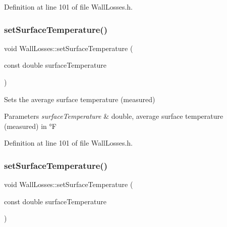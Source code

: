 Definition at line 101 of file Wall\+Losses.\+h.

\mbox{\label{class_wall_losses_a7aaa1bd0d7e0ec67db33668ccc6c48da}} 
\subsubsection{\texorpdfstring{set\+Surface\+Temperature()}{setSurfaceTemperature()}\hspace{0.1cm}{\footnotesize\ttfamily [2/3]}}
{\footnotesize\ttfamily void Wall\+Losses\+::set\+Surface\+Temperature (\begin{DoxyParamCaption}\item[{const double}]{surface\+Temperature }\end{DoxyParamCaption})\hspace{0.3cm}{\ttfamily [inline]}}

Sets the average surface temperature (measured) 
\begin{DoxyParams}{Parameters}
{\em surface\+Temperature} & double, average surface temperature (measured) in °F \\
\hline
\end{DoxyParams}


Definition at line 101 of file Wall\+Losses.\+h.

\mbox{\label{class_wall_losses_a7aaa1bd0d7e0ec67db33668ccc6c48da}} 
\subsubsection{\texorpdfstring{set\+Surface\+Temperature()}{setSurfaceTemperature()}\hspace{0.1cm}{\footnotesize\ttfamily [3/3]}}
{\footnotesize\ttfamily void Wall\+Losses\+::set\+Surface\+Temperature (\begin{DoxyParamCaption}\item[{const double}]{surface\+Temperature }\end{DoxyParamCaption})\hspace{0.3cm}{\ttfamily [inline]}}

